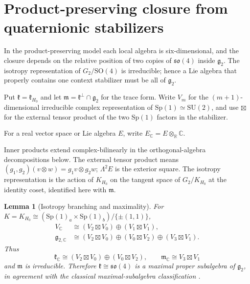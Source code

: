 \documentclass[11pt,a4paper]{article}
\newtheorem{lemma}[lemma]{Lemma}
\newcommand{\RR}{\mathbb R}
\newcommand{\CC}{\mathbb C}
\newcommand{\SO}{\mathrm{SO}}
\newcommand{\SU}{\mathrm{SU}}
\newcommand{\Sp}{\mathrm{Sp}}
\begin{document}
\section{Product-preserving closure from quaternionic stabilizers}
\label{sec:g2closure}

In the product-preserving model each local algebra is six-dimensional, and the closure depends on the relative position of two copies of $\mathfrak{so}(4)$ inside $\mathfrak g_2$.  The isotropy representation of $G_2/\SO(4)$ is irreducible; hence a Lie algebra that properly contains one context stabilizer must be all of $\mathfrak g_2$.

Put $\mathfrak k=\mathfrak k_{H_0}$ and let $\mathfrak m=\mathfrak k^\perp\cap\mathfrak g_2$ for the trace form.  Write $V_m$ for the $(m+1)$-dimensional irreducible complex representation of $\Sp(1)\simeq\SU(2)$, and use $\boxtimes$ for the external tensor product of the two $\Sp(1)$ factors in the stabilizer.

For a real vector space or Lie algebra $E$, write $E_{\CC}=E\otimes_{\RR}\CC$.

Inner products extend complex-bilinearly in the orthogonal-algebra decompositions below.  The external tensor product means $(g_1,g_2)(v\otimes w)=g_1v\otimes g_2w$; $\Lambda^2E$ is the exterior square.  The isotropy representation is the action of $K_{H_0}$ on the tangent space of $G_2/K_{H_0}$ at the identity coset, identified here with $\mathfrak m$.

\begin{lemma}[Isotropy branching and maximality]
\label{lem:maximality}
For $K=K_{H_0}\cong(\Sp(1)_a\times\Sp(1)_b)/\{\pm(1,1)\}$,
\begin{align}
V_{\CC}&\cong(V_2\boxtimes V_0)\oplus(V_1\boxtimes V_1),\label{eq:Vbranch}\\
\mathfrak g_{2,\CC}&\cong(V_2\boxtimes V_0)\oplus(V_0\boxtimes V_2)\oplus(V_3\boxtimes V_1).
\label{eq:gbranch}
\end{align}
Thus
\[
\mathfrak k_{\CC}\cong(V_2\boxtimes V_0)\oplus(V_0\boxtimes V_2),
\qquad
\mathfrak m_{\CC}\cong V_3\boxtimes V_1
\]
and $\mathfrak m$ is irreducible.  Therefore $\mathfrak k\cong\mathfrak{so}(4)$ is a maximal proper subalgebra of $\mathfrak g_2$, in agreement with the classical maximal-subalgebra classification \cite{Dynkin1952b}.
\end{lemma}
\end{document}
